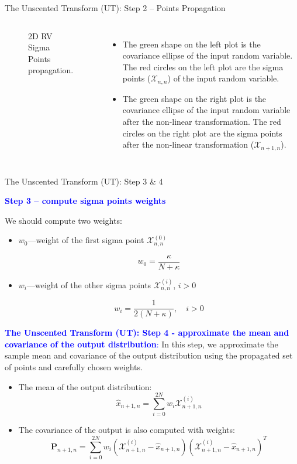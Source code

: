 \begin{frame}{The Unscented Transform (UT): Step 2 – Points Propagation}
\begin{columns}
\begin{figure}
    \caption{2D RV Sigma Points propagation.}
\end{figure}
\begin{itemize}
    \item The green shape on the left plot is the covariance ellipse of the input random variable. The red circles on the left plot are the sigma points ($\mathcal{X}_{n,n}$) of the input random variable.
    \item The green shape on the right plot is the covariance ellipse of the input random variable after the non-linear transformation. The red circles on the right plot are the sigma points after the non-linear transformation ($\mathcal{X}_{n+1,n}$).
\end{itemize}

\end{columns}
\end{frame}


\begin{frame}{The Unscented Transform (UT): Step 3 \& 4}

\textcolor{blue}{\textbf{Step 3 – compute sigma points weights}}

We should compute two weights:
\begin{itemize}
    \item \(w_0\)---weight of the first sigma point \(\mathbf{\mathcal{X}}^{(0)}_{n,n}\)

    \[
    w_0 = \frac{\kappa}{N + \kappa}
    \]
    
    \item \(w_i\)---weight of the other sigma points \(\mathbf{\mathcal{X}}^{(i)}_{n,n}\), \(i > 0\)

    \[
    w_i = \frac{1}{2(N + \kappa)}, \quad i > 0
    \]
\end{itemize}

\textcolor{blue}{\textbf{The Unscented Transform (UT): Step 4 - approximate the mean and covariance of the output
distribution}:} In this step, we approximate the sample mean and covariance of the output distribution using the propagated set of points and carefully chosen weights.

\begin{itemize}
    \item The mean of the output distribution:
\[
\hat{x}_{n+1,n} = \sum_{i=0}^{2N} w_i \mathbf{\mathcal{X}}^{(i)}_{n+1,n}
\]

\item The covariance of the output is also computed with weights:
\[
\mathbf{P}_{n+1,n} = \sum_{i=0}^{2N} w_i \left( \mathbf{\mathcal{X}}^{(i)}_{n+1,n} - \hat{x}_{n+1,n} \right) \left( \mathbf{\mathcal{X}}^{(i)}_{n+1,n} - \hat{x}_{n+1,n} \right)^T
\]
\end{itemize}




\end{frame}


